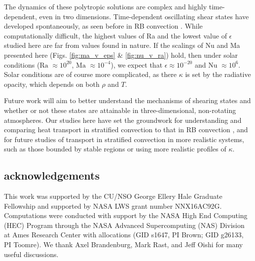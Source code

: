 \documentclass[aps, prl, twocolumn, nofootinbib, groupedaddress, amsfonts, amssymb, amsmath]{revtex4-1}
\begin{document}

The dynamics of these polytropic solutions are complex and highly time-dependent, even in two dimensions.
Time-dependent oscillating shear states have developed spontaneously, as seen before in RB convection
\cite{goluskin&all2014}.  While computationally difficult, the highest values of Ra and the lowest value
of $\epsilon$ studied here are far from values found in nature.  If the scalings of Nu and Ma
presented here (Figs. \ref{fig:ma_v_eps} \& \ref{fig:nu_v_ra}) hold, then under solar conditions ($\text{Ra }\approx 10^{20}$, $\text{Ma }\approx 10^{-4}$), we expect that $\epsilon \approx 10^{-20}$ and
$\text{Nu }\approx 10^{6}$.  
Solar conditions are of course more complicated, as there $\kappa$ is
set by the radiative opacity, which depends on both $\rho$ and $T$.

Future work will aim to better understand the mechanisms of shearing states and
whether or not these states are attainable in three-dimensional, non-rotating atmospheres.  Our studies
here have set the groundwork for understanding and comparing heat transport in stratified convection
to that in RB convection \cite{johnston&doering2009}, and for future studies of transport in stratified
convection in more realistic systems, such as those bounded by stable regions \cite{hurlburt&all1986} or 
using more realistic profiles of $\kappa$.



\subsection{acknowledgements}
This work was supported by the CU/NSO George Ellery Hale Graduate Fellowship
and supported by NASA LWS grant number NNX16AC92G.  Computations were conducted 
with support by the NASA High End Computing (HEC) Program through the NASA 
Advanced Supercomputing (NAS) Division at Ames Research Center
with allocations (GID s1647, PI Brown; GID g26133, PI Toomre).
We thank Axel Brandenburg, Mark Rast, and Jeff Oishi for many useful discussions.


\end{document}
